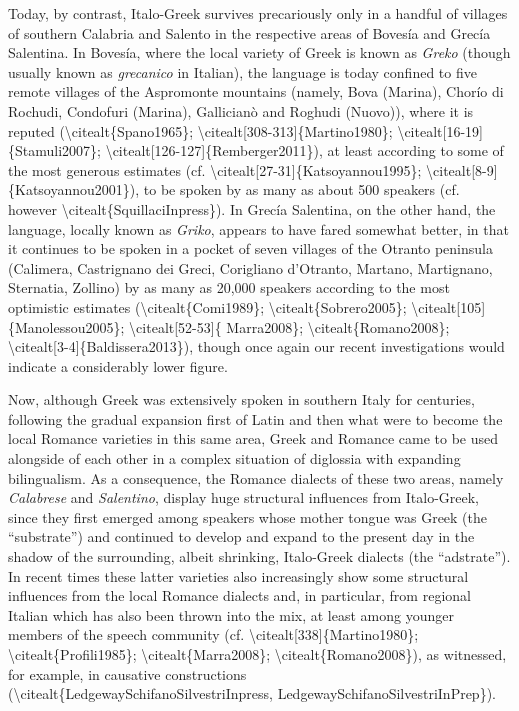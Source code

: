 \documentclass[12pt]{article}
\newenvironment{styleStandard}{\setlength\leftskip{0cm}\setlength\rightskip{0cm plus 1fil}\setlength\parindent{0cm}\setlength\parfillskip{0pt plus 1fil}\setlength\parskip{0cm plus 1pt}\writerlistparindent\writerlistleftskip\leavevmode\normalfont\normalsize\writerlistlabel\ignorespaces}{\unskip\vspace{0cm plus 1pt}\par}
\newcommand\writerlistleftskip{}
\newcommand\writerlistparindent{}
\newcommand\writerlistlabel{}
\begin{document}
\begin{styleStandard}
Today, by contrast, Italo-Greek survives precariously only in a handful of villages of southern Calabria and Salento in the respective areas of Bovesía and Grecía Salentina. In Bovesía, where the local variety of Greek is known as \textit{Greko }(though usually known as \textit{grecanico }in Italian), the language is today confined to five remote villages of the Aspromonte mountains (namely, Bova (Marina), Chorío di Rochudi, Condofuri (Marina), Gallicianò and Roghudi (Nuovo)), where it is reputed ({\textbackslash}citealt\{Spano1965\}; {\textbackslash}citealt[308-313]\{Martino1980\}; {\textbackslash}citealt[16-19]\{Stamuli2007\}; {\textbackslash}citealt[126-127]\{Remberger2011\}), at least according to some of the most generous estimates (cf. {\textbackslash}citealt[27-31]\{Katsoyannou1995\}; {\textbackslash}citealt[8-9]\{Katsoyannou2001\}), to be spoken by as many as about 500 speakers (cf. however {\textbackslash}citealt\{SquillaciInpress\}). In Grecía Salentina, on the other hand, the language, locally known as \textit{Griko}, appears to have fared somewhat better, in that it continues to be spoken in a pocket of seven villages of the Otranto peninsula (Calimera, Castrignano dei Greci, Corigliano d’Otranto, Martano, Martignano, Sternatia, Zollino) by as many as 20,000 speakers according to the most optimistic estimates ({\textbackslash}citealt\{Comi1989\}; {\textbackslash}citealt\{Sobrero2005\}; {\textbackslash}citealt[105]\{Manolessou2005\}; {\textbackslash}citealt[52-53]\{ Marra2008\}; {\textbackslash}citealt\{Romano2008\}; {\textbackslash}citealt[3-4]\{Baldissera2013\}), though once again our recent investigations would indicate a considerably lower figure.
\end{styleStandard}

\begin{styleStandard}
Now, although Greek was extensively spoken in southern Italy for centuries, following the gradual expansion first of Latin and then what were to become the local Romance varieties in this same area, Greek and Romance came to be used alongside of each other in a complex situation of diglossia with expanding bilingualism. As a consequence, the Romance dialects of these two areas, namely \textit{Calabrese }and \textit{Salentino}, display huge structural influences from Italo-Greek, since they first emerged among speakers whose mother tongue was Greek (the “substrate”) and continued to develop and expand to the present day in the shadow of the surrounding, albeit shrinking, Italo-Greek dialects (the “adstrate”). In recent times these latter varieties also increasingly show some structural influences from the local Romance dialects and, in particular, from regional Italian which has also been thrown into the mix, at least among younger members of the speech community (cf. {\textbackslash}citealt[338]\{Martino1980\}; {\textbackslash}citealt\{Profili1985\}; {\textbackslash}citealt\{Marra2008\}; {\textbackslash}citealt\{Romano2008\}), as witnessed, for example, in causative constructions ({\textbackslash}citealt\{LedgewaySchifanoSilvestriInpress, LedgewaySchifanoSilvestriInPrep\}).
\end{styleStandard}
\end{document}
